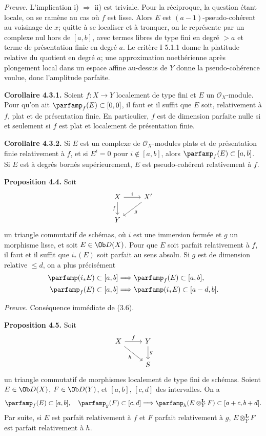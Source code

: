 \documentclass[11pt]{article}
\begin{document}
\emph{Preuve.} L'implication i) \(\Rightarrow\) ii) est triviale. Pour la réciproque, la question étant locale, on se ramène au cas où \(f\) est lisse. Alors \(E\) est \((a-1)\)-pseudo-cohérent au voisinage de \(x\); quitte à se localiser et à tronquer, on le représente par un complexe nul hors de \([a,b]\), avec termes libres de type fini en degré \(>a\) et terme de présentation finie en degré \(a\). Le critère I 5.1.1 donne la platitude relative du quotient en degré \(a\); une approximation noethérienne après plongement local dans un espace affine au-dessus de \(Y\) donne la pseudo-cohérence voulue, donc l'amplitude parfaite.

\textbf{Corollaire 4.3.1.} Soient \(f:X\to Y\) localement de type fini et \(E\) un \(\mathcal O_X\)-module. Pour qu'on ait \(\parfamp_f(E)\subset[0,0]\), il faut et il suffit que \(E\) soit, relativement à \(f\), plat et de présentation finie. En particulier, \(f\) est de dimension parfaite nulle si et seulement si \(f\) est plat et localement de présentation finie.

\textbf{Corollaire 4.3.2.} Si \(E\) est un complexe de \(\mathcal O_X\)-modules plats et de présentation finie relativement à \(f\), et si \(E^i=0\) pour \(i\notin[a,b]\), alors \(\parfamp_f(E)\subset[a,b]\). Si \(E\) est à degrés bornés supérieurement, \(E\) est pseudo-cohérent relativement à \(f\).

\textbf{Proposition 4.4.} Soit
\[
\begin{tikzcd}
X \arrow[r,"i"] \arrow[d,"f"'] & X' \arrow[dl,"g"]\\
Y &
\end{tikzcd}
\]
un triangle commutatif de schémas, où \(i\) est une immersion fermée et \(g\) un morphisme lisse, et soit \(E\in\Ob D(X)\). Pour que \(E\) soit parfait relativement à \(f\), il faut et il suffit que \(i_*(E)\) soit parfait au sens absolu. Si \(g\) est de dimension relative \(\leq d\), on a plus précisément
\begin{align*}
\parfamp(i_*E)
  \subset[a,b]&\Longrightarrow \parfamp_f(E)
  \subset[a,b],\\
\parfamp_f(E)
  \subset[a,b]&\Longrightarrow \parfamp(i_*E)
  \subset[a-d,b].
\end{align*}

\emph{Preuve.} Conséquence immédiate de (3.6).

\textbf{Proposition 4.5.} Soit
\[
\begin{tikzcd}
X \arrow[r,"f"] \arrow[dr,"h"'] & Y \arrow[d,"g"]\\
& S
\end{tikzcd}
\]
un triangle commutatif de morphismes localement de type fini de schémas. Soient \(E\in\Ob D(X)\), \(F\in\Ob D(Y)\), et \([a,b]\), \([c,d]\) des intervalles. On a
\[
 \parfamp_f(E)\subset[a,b],\quad
 \parfamp_g(F)\subset[c,d]
 \Longrightarrow
 \parfamp_h(E\otimes_Y^{\mathbf L}F)
 \subset[a+c,b+d].
\]
Par suite, si \(E\) est parfait relativement à \(f\) et \(F\) parfait relativement à \(g\), \(E\otimes_Y^{\mathbf L}F\) est parfait relativement à \(h\).
\end{document}
